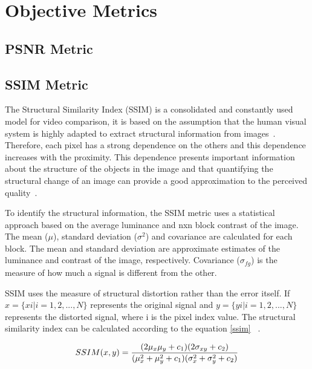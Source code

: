 \documentclass{acm_proc_article-sp}
\begin{document}
\section{Objective Metrics}

\subsection{PSNR Metric}




\subsection{SSIM Metric}


The Structural Similarity Index (SSIM) is a consolidated and constantly used model for video comparison, it is based on the assumption that the human visual system is highly adapted to extract structural information from images~\cite{danilo:12}. Therefore, each pixel has a strong dependence on the others and this dependence increases with the proximity. This dependence presents important information about the structure of the objects in the image and that quantifying the structural change of an image can provide a good approximation to the perceived quality~\cite{Wang:02}.

To identify the structural information, the SSIM metric uses a statistical approach based on the average luminance and nxn block contrast of the image. The mean ($\mu$), standard deviation ($\sigma^{2}$) and covariance are calculated for each block. The mean and standard deviation are approximate estimates of the luminance and contrast of the image, respectively. Covariance ($\sigma_{fg}$) is the measure of how much a signal is different from the other.

SSIM uses the measure of structural distortion rather than the error itself. If $x = \{x i | i = 1, 2,. . . , N\}$ represents the original signal and $y = \{y i | i = 1, 2,. . . , N\}$ represents the distorted signal, where i is the pixel index value. The structural similarity index can be calculated according to the equation \ref{ssim} ~\cite{oliveira:16}\cite{Wang:02}.

\begin{equation}
\label{ssim}
\centering
SSIM(x, y) = \frac{(2\mu _{x}\mu _{y} + c _{1})(2\sigma _{xy}+c _{2})}{(\mu_{x}^{2}+\mu_{y}^{2}+ c_{1})(\sigma _{x}^{2}+\sigma _{y}^{2}+c _{2})}
\end{equation}
\end{document}
